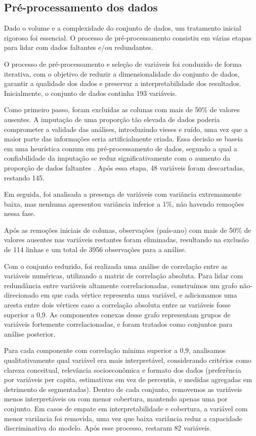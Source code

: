 \documentclass[letterpaper]{article}
\begin{document}
\subsection{Pré-processamento dos dados}

Dado o volume e a complexidade do conjunto de dados, um tratamento inicial rigoroso foi essencial. O processo de pré-processamento consistiu em várias etapas para lidar com dados faltantes e/ou redundantes.

O processo de pré-processamento e seleção de variáveis foi conduzido de forma iterativa, com o objetivo de reduzir a dimensionalidade do conjunto de dados, garantir a qualidade dos dados e preservar a interpretabilidade dos resultados. Inicialmente, o conjunto de dados continha 193 variáveis.

Como primeiro passo, foram excluídas as colunas com mais de 50\% de valores ausentes. A imputação de uma proporção tão elevada de dados poderia comprometer a validade das análises, introduzindo vieses e ruído, uma vez que a maior parte das informações seria artificialmente criada. Essa decisão se baseia em uma heurística comum em pré-processamento de dados, segundo a qual a confiabilidade da imputação se reduz significativamente com o aumento da proporção de dados faltantes \cite{chai2014rmse}. Após essa etapa, 48 variáveis foram descartadas, restando 145.

Em seguida, foi analisada a presença de variáveis com variância extremamente baixa, mas nenhuma apresentou variância inferior a 1\%, não havendo remoções nessa fase.

Após as remoções iniciais de colunas, observações (país-ano) com mais de 50\% de valores ausentes nas variáveis restantes foram eliminadas, resultando na exclusão de 114 linhas e um total de 3956 observações para a análise.

Com o conjunto reduzido, foi realizada uma análise de correlação entre as variáveis numéricas, utilizando a matriz de correlação absoluta. Para lidar com redundância entre variáveis altamente correlacionadas, construímos um grafo não-direcionado em que cada vértice representa uma variável, e adicionamos uma aresta entre dois vértices caso a correlação absoluta entre as variáveis fosse superior a 0{,}9. As componentes conexas desse grafo representam grupos de variáveis fortemente correlacionadas, e foram tratados como conjuntos para análise posterior.

Para cada componente com correlação mínima superior a 0{,}9, analisamos qualitativamente qual variável era mais interpretável, considerando critérios como clareza conceitual, relevância socioeconômica e formato dos dados (preferência por variáveis per capita, estimativas em vez de percentis, e medidas agregadas em detrimento de segmentadas). Dentro de cada conjunto, removemos as variáveis menos interpretáveis ou com menor cobertura, mantendo apenas uma por conjunto. Em casos de empate em interpretabilidade e cobertura, a variável com menor variância foi removida, uma vez que baixa variância reduz a capacidade discriminativa do modelo. Após esse processo, restaram 82 variáveis.
\end{document}
